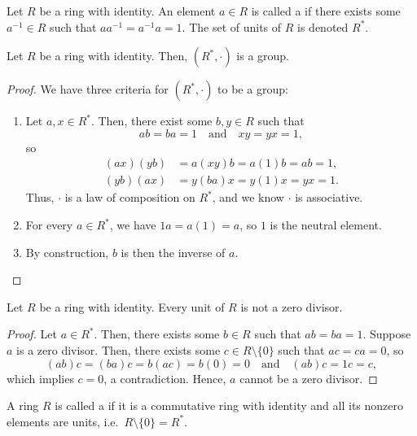 \begin{defn}
Let $ R $ be a ring with identity. An element $ a\in R $ is called a  if there exists some $ a^{-1}\in R $ such that $ aa^{-1}=a^{-1}a=1 $. The set of units of $ R $ is denoted $ R^* $.
\end{defn}

\begin{prop}
Let $ R $ be a ring with identity. Then, $ (R^*,\cdot) $ is a group.
\end{prop}
\begin{proof}
We have three criteria for $ (R^*,\cdot) $ to be a group:
\begin{enumerate}
    \item Let $ a,x\in R^* $. Then, there exist some $ b,y\in R $ such that
    \begin{equation*}
        ab=ba=1 \quad\text{and}\quad xy=yx=1,
    \end{equation*}
    so
    \begin{align*}
        (ax)(yb) &= a(xy)b=a(1)b=ab=1, \\
        (yb)(ax) &= y(ba)x=y(1)x=yx=1.
    \end{align*}
    Thus, $ \cdot $ is a law of composition on $ R^* $, and we know $ \cdot $ is associative.

    \item For every $ a\in R^* $, we have $ 1 a=a(1)=a $, so $ 1 $ is the neutral element.
    
    \item By construction, $ b $ is then the inverse of $ a $.\qedhere
\end{enumerate}
\end{proof}

\begin{prop}
Let $ R $ be a ring with identity. Every unit of $ R $ is not a zero divisor.
\end{prop}
\begin{proof}
Let $ a\in R^* $. Then, there exists some $ b\in R $ such that $ ab=ba=1 $. Suppose $ a $ is a zero divisor. Then, there exists some $ c\in R\setminus\{0\} $ such that $ ac=ca=0 $, so
\begin{equation*}
    (ab)c=(ba)c=b(ac)=b(0)=0 \quad\text{and}\quad (ab)c=1c=c,
\end{equation*}
which implies $ c=0 $, a contradiction. Hence, $ a $ cannot be a zero divisor.
\end{proof}

\begin{defn}
A ring $ R $ is called a  if it is a commutative ring with identity and all its nonzero elements are units, i.e.\ $ R\setminus\{0\}=R^* $.
\end{defn}

